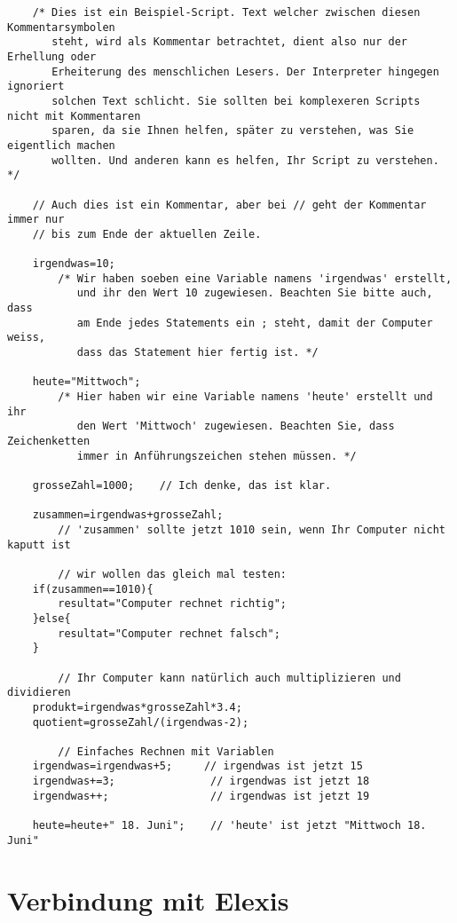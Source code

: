 \documentclass[a4paper]{scrartcl}
\begin{document}
\begin{verbatim}
    /* Dies ist ein Beispiel-Script. Text welcher zwischen diesen Kommentarsymbolen
       steht, wird als Kommentar betrachtet, dient also nur der Erhellung oder
       Erheiterung des menschlichen Lesers. Der Interpreter hingegen ignoriert
       solchen Text schlicht. Sie sollten bei komplexeren Scripts nicht mit Kommentaren
       sparen, da sie Ihnen helfen, später zu verstehen, was Sie eigentlich machen
       wollten. Und anderen kann es helfen, Ihr Script zu verstehen. */

    // Auch dies ist ein Kommentar, aber bei // geht der Kommentar immer nur
    // bis zum Ende der aktuellen Zeile.

    irgendwas=10;
        /* Wir haben soeben eine Variable namens 'irgendwas' erstellt,
           und ihr den Wert 10 zugewiesen. Beachten Sie bitte auch, dass
           am Ende jedes Statements ein ; steht, damit der Computer weiss,
           dass das Statement hier fertig ist. */

    heute="Mittwoch";
        /* Hier haben wir eine Variable namens 'heute' erstellt und ihr
           den Wert 'Mittwoch' zugewiesen. Beachten Sie, dass Zeichenketten
           immer in Anführungszeichen stehen müssen. */

    grosseZahl=1000;    // Ich denke, das ist klar.

    zusammen=irgendwas+grosseZahl;
        // 'zusammen' sollte jetzt 1010 sein, wenn Ihr Computer nicht kaputt ist

        // wir wollen das gleich mal testen:
    if(zusammen==1010){
        resultat="Computer rechnet richtig";
    }else{
        resultat="Computer rechnet falsch";
    }

        // Ihr Computer kann natürlich auch multiplizieren und dividieren
    produkt=irgendwas*grosseZahl*3.4;
    quotient=grosseZahl/(irgendwas-2);

        // Einfaches Rechnen mit Variablen
    irgendwas=irgendwas+5;     // irgendwas ist jetzt 15
    irgendwas+=3;               // irgendwas ist jetzt 18
    irgendwas++;                // irgendwas ist jetzt 19

    heute=heute+" 18. Juni";    // 'heute' ist jetzt "Mittwoch 18. Juni"

\end{verbatim}

\section{Verbindung mit Elexis}
\end{document}
